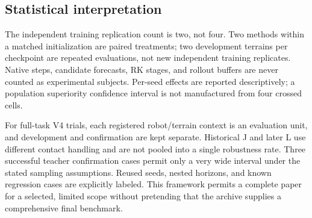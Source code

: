 \subsection{Statistical interpretation}
The independent training replication count is two, not four. Two methods within a matched initialization are paired treatments; two development terrains per checkpoint are repeated evaluations, not new independent training replicates. Native steps, candidate forecasts, RK stages, and rollout buffers are never counted as experimental subjects. Per-seed effects are reported descriptively; a population superiority confidence interval is not manufactured from four crossed cells.

For full-task V4 trials, each registered robot/terrain context is an evaluation unit, and development and confirmation are kept separate. Historical J and later L use different contact handling and are not pooled into a single robustness rate. Three successful teacher confirmation cases permit only a very wide interval under the stated sampling assumptions. Reused seeds, nested horizons, and known regression cases are explicitly labeled. This framework permits a complete paper for a selected, limited scope without pretending that the archive supplies a comprehensive final benchmark.
